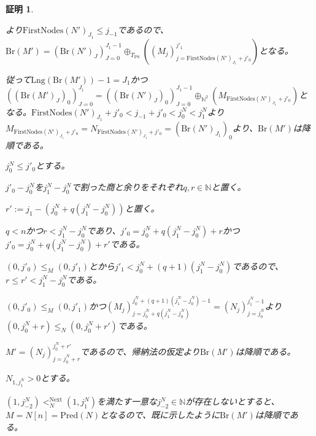 \documentclass[dvipdfmx,uplatex]{jsarticle}
\theoremstyle{customnonumberbreakfortheorem}
\theoremstyle{customnonumberbreakforproof}
\newtheorem{hideableproof}{証明}
\begin{document}
\begin{hideableproof}
\begin{indented}
\begin{indented}
\begin{indented}
\begin{indented}
					\begin{indented}
						\item {}より\(\textrm{FirstNodes}(N')_{J_1} \leq j_{-1}\)であるので、\(\textrm{Br}(M') = (\textrm{Br}(N')_J)_{J=0}^{J_1-1} \oplus_{T_{\textrm{PS}}} ((M_j)_{j = \textrm{FirstNodes}(N')_{J_1}+j'_0}^{j'_1})\)となる。
						\item 従って\(\textrm{Lng}(\textrm{Br}(M'))-1 = J_1\)かつ\(((\textrm{Br}(M')_J)_0)_{J=0}^{J_1} = ((\textrm{Br}(N')_J)_0)_{J=0}^{J_1-1} \oplus_{\mathbb{N}^2} (M_{\textrm{FirstNodes}(N')_{J_1}+j'_0})\)となる。\(\textrm{FirstNodes}(N')_{J_1}+j'_0 < j_{-1}+j'_0 < j_0^N < j_1^N\)より\(M_{\textrm{FirstNodes}(N')_{J_1}+j'_0} = N_{\textrm{FirstNodes}(N')_{J_1}+j'_0} = (\textrm{Br}(N')_{J_1})_0\)より、\(\textrm{Br}(M')\)は降順である。
					\end{indented}
				\end{indented}
				\item
				\item \(j_0^N \leq j'_0\)とする。
				\begin{indented}
					\item \(j'_0-j_0^N\)を\(j_1^N-j_0^N\)で割った商と余りをそれぞれ\(q,r \in \mathbb{N}\)と置く。
					\item \(r' := j_1-(j_0^N+q(j_1^N-j_0^N))\)と置く。
					\item \(q < n\)かつ\(r < j_1^N-j_0^N\)であり、\(j'_0 = j_0^N+q(j_1^N-j_0^N)+r\)かつ\(j'_0 = j_0^N+q(j_1^N-j_0^N)+r'\)である。
					\item \((0,j'_0) \leq_M (0,j'_1)\)とから\(j'_1 < j_0^N+(q+1)(j_1^N-j_0^N)\)であるので、\(r \leq r' < j_1^N-j_0^N\)である。
					\item \((0,j'_0) \leq_M (0,j'_1)\)かつ\((M_j)_{j=j_0^N+q(j_1^N-j_0^N)}^{j_0^N+(q+1)(j_1^N-j_0^N)-1} = (N_j)_{j=j_0^N}^{j_1^N-1}\)より\((0,j_0^N+r) \leq_N (0,j_0^N+r')\)である。
					\item \(M' = (N_j)_{j=j_0^N+r}^{j_0^N+r'}\)であるので、帰納法の仮定より\(\textrm{Br}(M')\)は降順である。
				\end{indented}
			\end{indented}
			\item
			\item \(N_{1,j_1^N} > 0\)とする。
			\begin{indented}
				\item \((1,j_{-2}^N) <_N^{\textrm{Next}} (1,j_1^N)\)を満たす一意な\(j_{-2}^N \in \mathbb{N}\)が存在しないとすると、\(M = N[n] = \textrm{Pred}(N)\)となるので、既に示したように\(\textrm{Br}(M')\)は降順である。

\end{indented}
\end{indented}
\end{indented}
\end{hideableproof}
\end{document}
